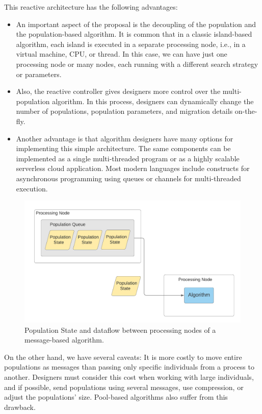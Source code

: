 \documentclass[review]{elsarticle}
\begin{document}
This reactive architecture has the following advantages:\begin{itemize}
\item 
An important aspect of the proposal is the decoupling of the population and 
the population-based algorithm. It is common that in a classic island-based algorithm,
each island is executed in a separate processing node, i.e., in a virtual machine, CPU,
or thread. In this case, we can have just one processing node or many nodes, each 
running with a different search strategy or parameters. 
\item 
Also, the reactive controller gives designers more control over the multi-population algorithm.
In this process, designers can dynamically change the number of populations, population parameters,
and migration details on-the-fly.
\item 
Another advantage is that algorithm designers have many options for implementing this simple architecture. 
The same components can be implemented as a single multi-threaded program or 
as a highly scalable serverless cloud application. Most modern languages include 
constructs for asynchronous programming using queues or channels for multi-threaded
execution.
\end{itemize}

\begin{figure}[ht]
    \centering
    \includegraphics[width=\textwidth]{population_message}
    \caption{Population State and dataflow between processing nodes of a message-based algorithm.}
    \label{fig:population_message}
\end{figure}

On the other hand, we have several caveats: It is more
costly to move entire populations as messages than passing only
specific individuals from a process to another. Designers must consider
this cost when working with large individuals, and if possible, send
populations using several messages, use compression, or adjust the populations'
size. Pool-based algorithms also suffer from this drawback.
\end{document}
